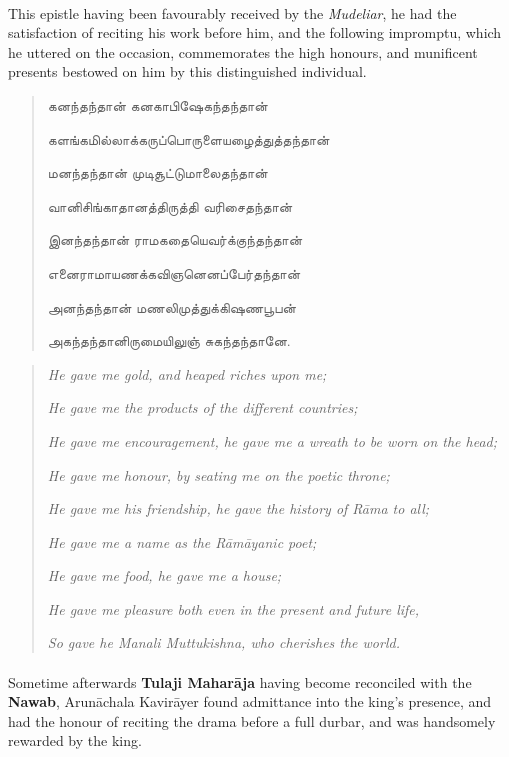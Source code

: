 \documentclass{article}
\newcommand{\TamilText}[1]{\texttamil{#1}}
\newcommand{\tam}[1]{\TamilText{#1}}
\begin{document}
\paragraph{}
This epistle having been favourably received by the \emph{Mudeliar}, he had the satisfaction of reciting his work before him, and the following impromptu, which he uttered on the occasion, commemorates the high honours, and munificent presents bestowed on him by this distinguished individual.
\begin{quotation}\small
\tam{கனந்தந்தான் கனகாபிஷேகந்தந்தான்‌}

\tam{களங்கமில்லாக்கருப்பொருளையழைத்துத்தந்தான்‌}

\tam{மனந்தந்தான்‌ முடிசூட்டுமாலைதந்தான்‌}

\tam{வானிசிங்காதானத்திருத்தி வரிசைதந்தான்‌}

\tam{இனந்தந்தான்‌ ராமகதையெவர்க்குந்தந்தான்}

\tam{எனைராமாயணக்கவிஞனெனப்பேர்தந்தான்‌}

\tam{அனந்தந்தான்‌ மணலிமுத்துக்கிஷணபூபன்‌}

\tam{அகந்தந்தானிருமையிலுஞ்‌ சுகந்தந்தானே}.
\end{quotation}
\begin{quotation}\small
\emph{He gave me gold, and heaped riches upon me;}

\emph{He gave me the products of the different countries;}

\emph{He gave me encouragement, he gave me a wreath to be worn on the head;}

\emph{He gave me honour, by seating me on the poetic throne;}

\emph{He gave me his friendship, he gave the history of R\={a}ma to all;}

\emph{He gave me a name as the R\={a}m\={a}yanic poet;}

\emph{He gave me food, he gave me a house;}

\emph{He gave me pleasure both even in the present and future life,}

\emph{So gave he Manali Muttukishna, who cherishes the world.}
\end{quotation}
\paragraph{}
Sometime afterwards \textbf{Tulaji Mahar\={a}ja} having become reconciled with the \textbf{Nawab}, Arun\={a}chala Kavir\={a}yer found admittance into the king's presence, and had the honour of reciting the drama before a full durbar, and was handsomely rewarded by the king.
\end{document}
